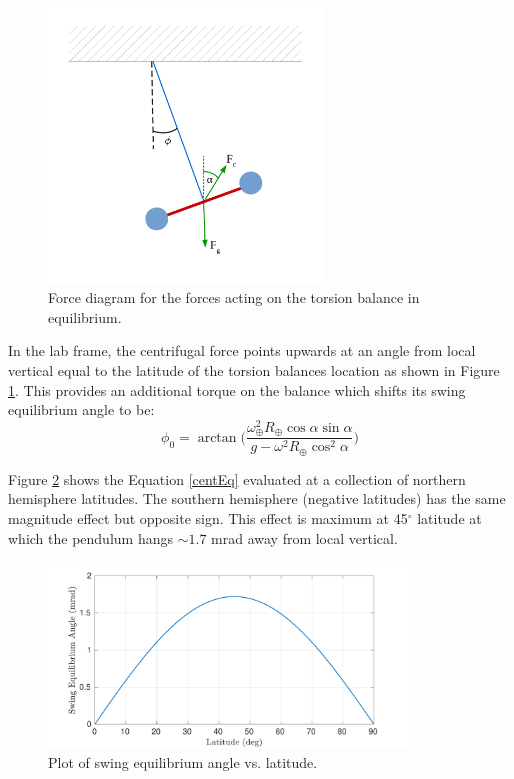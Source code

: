 \documentclass{book}
\begin{document}
 \begin{figure}[!h]
\begin{centering}
\includegraphics[width=0.65\textwidth]{CentrifugalForce.pdf}
\caption{Force diagram for the forces acting on the torsion balance in equilibrium.}\label{centForFig}
\end{centering}
\end{figure}

In the lab frame, the centrifugal force points upwards at an angle from local vertical equal to the latitude of the torsion balances location as shown in Figure \ref{centForFig}. This provides an additional torque on the balance which shifts its swing equilibrium angle to be:
\begin{equation}
\phi_0 = \arctan\bigg(\frac{\omega_\oplus^2R_\oplus \cos \alpha \sin \alpha}{g-\omega^2R_\oplus \cos^2 \alpha}\bigg) \label{centEq}
\end{equation}

Figure \ref{centPlotFig} shows the Equation \ref{centEq} evaluated at a collection of northern hemisphere latitudes. The southern hemisphere (negative latitudes) has the same magnitude effect but opposite sign. This effect is maximum at 45$^\circ$ latitude at which the pendulum hangs $\sim1.7$ mrad away from local vertical. 

 \begin{figure}[!h]
\begin{centering}
\includegraphics[width=0.85\textwidth]{CentrifugalPlot.pdf}
\caption{Plot of swing equilibrium angle vs. latitude.}\label{centPlotFig}
\end{centering}
\end{figure}
\end{document}
